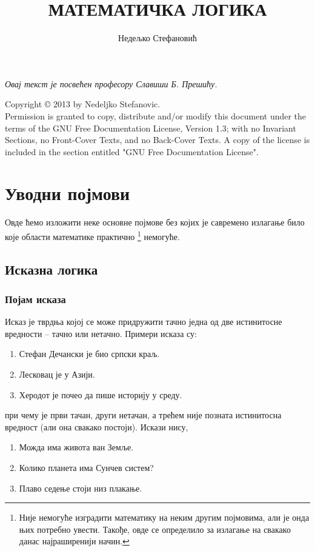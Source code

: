\documentclass[a4paper]{book}
\date{}
\author{Недељко Стефановић}
\title{МАТЕМАТИЧКА ЛОГИКА}
\begin{document}
\maketitle

\thispagestyle{empty}

\vspace*{\fill}
\begin{flushright}
\Large
\textit{%
Овај текст је посвећен професору Славиши Б. Прешићу.}
\end{flushright}
\vfill

\pagebreak

\thispagestyle{empty}

\noindent
Copyright \copyright{} 2013 by Nedeljko Stefanovic.
\\[2em]
Permission is granted to copy, distribute and/or modify this document
under the terms of the GNU Free Documentation License, Version 1.3;
with no Invariant Sections, no Front-Cover Texts, and no Back-Cover Texts.
A copy of the license is included in the section entitled "GNU
Free Documentation License".

\tableofcontents
\chapter{Уводни појмови}

\indent

Овде ћемо изложити неке основне појмове без којих је савремено излагање било које области математике практично%
\footnote{Није немогуће изградити математику на неким другим појмовима, али је онда њих потребно увести.
Такође, овде се определило за излагање на свакако данас најраширенији начин.}
немогуће.

\section{Исказна логика}

\subsection{Појам исказа}

\indent

Исказ је тврдња којој се може придружити тачно једна од две истинитосне вредности -- тачно или нетачно.
Примери исказа су:
\begin{enumerate}
\item
Стефан Дечански је био српски краљ.
\item
Лесковац је у Азији.
\item
Херодот је почео да пише историју у среду.
\end{enumerate}
при чему је први тачан, други нетачан, а трећем није позната истинитосна вредност (али она свакако постоји).
Искази нису,
\begin{enumerate}
\item
Можда има живота ван Земље.
\item
Колико планета има Сунчев систем?
\item
Плаво седење стоји низ плакање.
\end{enumerate}
\end{document}
